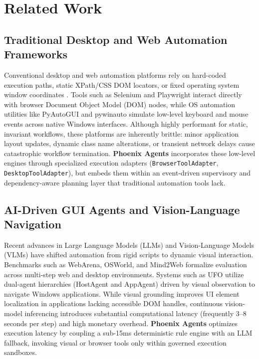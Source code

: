 \documentclass[conference]{IEEEtran}
\begin{document}
\section{Related Work}
\label{sec:related}

\subsection{Traditional Desktop and Web Automation Frameworks}
Conventional desktop and web automation platforms rely on hard-coded execution paths, static XPath/CSS DOM locators, or fixed operating system window coordinates \cite{garcia2026}. Tools such as Selenium and Playwright interact directly with browser Document Object Model (DOM) nodes, while OS automation utilities like PyAutoGUI and pywinauto simulate low-level keyboard and mouse events across native Windows interfaces. Although highly performant for static, invariant workflows, these platforms are inherently brittle: minor application layout updates, dynamic class name alterations, or transient network delays cause catastrophic workflow termination. \textbf{Phoenix Agents} incorporates these low-level engines through specialized execution adapters (\texttt{BrowserToolAdapter}, \texttt{DesktopToolAdapter}), but embeds them within an event-driven supervisory and dependency-aware planning layer that traditional automation tools lack.

\subsection{AI-Driven GUI Agents and Vision-Language Navigation}
Recent advances in Large Language Models (LLMs) and Vision-Language Models (VLMs) have shifted automation from rigid scripts to dynamic visual interaction. Benchmarks such as WebArena, OSWorld, and Mind2Web \cite{nguyen2025} formalize evaluation across multi-step web and desktop environments. Systems such as UFO utilize dual-agent hierarchies (HostAgent and AppAgent) driven by visual observation to navigate Windows applications. While visual grounding improves UI element localization in applications lacking accessible DOM handles, continuous vision-model inferencing introduces substantial computational latency (frequently 3--8 seconds per step) and high monetary overhead. \textbf{Phoenix Agents} optimizes execution latency by coupling a sub-15ms deterministic rule engine with an LLM fallback, invoking visual or browser tools only within governed execution sandboxes.
\end{document}
